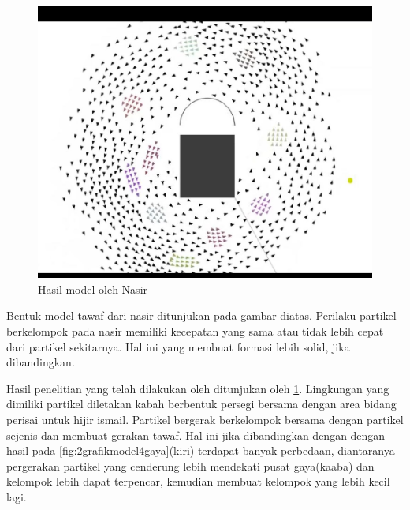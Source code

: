 \begin{figure}
\centering
\includegraphics[scale=0.4]{gambar/PaperNasir.JPG}
\caption{Hasil model oleh Nasir}
\label{fig:nasir1}
\end{figure}
\hspace{0.6cm}Bentuk model tawaf dari nasir\citep{Nasir2016} ditunjukan pada gambar diatas. Perilaku partikel berkelompok pada nasir memiliki kecepatan yang sama atau tidak lebih cepat dari partikel sekitarnya. Hal ini yang membuat formasi lebih solid, jika dibandingkan.

\hspace{0.6cm} Hasil penelitian yang telah dilakukan oleh \citep{Nasir2016} ditunjukan oleh \ref{fig:nasir1}. Lingkungan yang dimiliki partikel diletakan kabah berbentuk persegi bersama dengan area bidang perisai untuk hijir ismail. Partikel bergerak berkelompok bersama dengan partikel sejenis dan membuat gerakan tawaf. Hal ini jika dibandingkan dengan dengan hasil pada \ref{fig:2grafikmodel4gaya}(kiri) terdapat banyak perbedaan, diantaranya pergerakan partikel yang cenderung lebih mendekati pusat gaya(kaaba) dan kelompok lebih dapat terpencar, kemudian membuat kelompok yang lebih kecil lagi.

